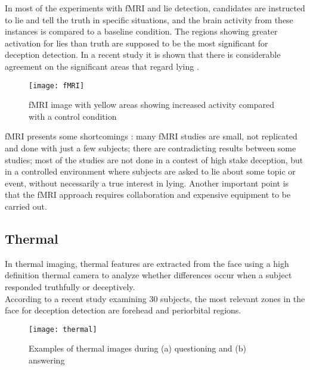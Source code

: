 In most of the experiments with fMRI and lie detection, candidates are instructed to lie and tell the truth in specific situations, and the brain activity from these instances is compared to a baseline condition. The regions showing greater activation for lies than truth are supposed to be the most significant for deception detection. In a recent study it is shown that there is considerable agreement on the significant areas that regard lying \cite{fMRILD}.\\
\begin{figure}[h]
	\centering
	\texttt{[image: fMRI]}
	\caption{fMRI image with yellow areas showing increased activity compared with a control condition  \cite{WikifMRI}}
\end{figure}
fMRI presents some shortcomings \cite{fMRIDD}\cite{fMRIDA}: many fMRI studies are small, not replicated and done with just a few subjects; there are contradicting results between some studies; most of the studies are not done in a contest of high stake deception, but in a controlled environment where subjects are asked to lie about some topic or event, without necessarily a true interest in lying. Another important point is that the fMRI approach requires collaboration and expensive equipment to be carried out.

\subsection*{Thermal}
In thermal imaging, thermal features are extracted from the face using a high definition thermal camera to analyze whether differences occur when a subject responded truthfully or deceptively. \\
According to a recent study \cite{Abouelenien:2015:TAD:2823465.2823470} examining 30 subjects, the most relevant zones in the face for deception detection are forehead and periorbital regions. 

\begin{figure}[h]
	\centering
	\texttt{[image: thermal]}
	\caption{Examples of thermal images during (a) questioning and (b) answering \cite{6967765}}
\end{figure}

